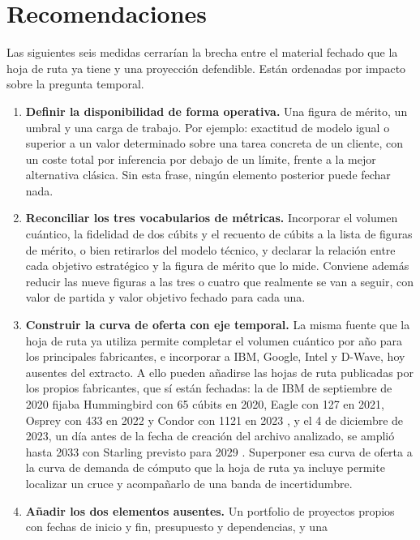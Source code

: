 \documentclass[11pt,letterpaper]{article}
\begin{document}
\section{Recomendaciones}

Las siguientes seis medidas cerrarían la brecha entre el material fechado que
la hoja de ruta ya tiene y una proyección defendible. Están ordenadas por
impacto sobre la pregunta temporal.

\begin{enumerate}[label=\textbf{\arabic*.}]
  \item \textbf{Definir la disponibilidad de forma operativa.} Una figura de
    mérito, un umbral y una carga de trabajo. Por ejemplo: exactitud de modelo
    igual o superior a un valor determinado sobre una tarea concreta de un
    cliente, con un coste total por inferencia por debajo de un límite, frente
    a la mejor alternativa clásica. Sin esta frase, ningún elemento posterior
    puede fechar nada.
  \item \textbf{Reconciliar los tres vocabularios de métricas.} Incorporar el
    volumen cuántico, la fidelidad de dos cúbits y el recuento de cúbits a la
    lista de figuras de mérito, o bien retirarlos del modelo técnico, y
    declarar la relación entre cada objetivo estratégico y la figura de mérito
    que lo mide. Conviene además reducir las nueve figuras a las tres o cuatro
    que realmente se van a seguir, con valor de partida y valor objetivo
    fechado para cada una.
  \item \textbf{Construir la curva de oferta con eje temporal.} La misma fuente
    que la hoja de ruta ya utiliza permite completar el volumen cuántico por
    año para los principales fabricantes, e incorporar a IBM, Google, Intel y
    D-Wave, hoy ausentes del extracto. A ello pueden añadirse las hojas de ruta
    publicadas por los propios fabricantes, que sí están fechadas: la de IBM de
    septiembre de 2020 fijaba Hummingbird con 65 cúbits en 2020, Eagle con 127
    en 2021, Osprey con 433 en 2022 y Condor con 1121 en 2023
    \parencite{ibm2020}, y el 4 de diciembre de 2023, un día antes de la fecha
    de creación del archivo analizado, se amplió hasta 2033 con Starling
    previsto para 2029 \parencite{ibm2023}. Superponer esa curva de oferta a la
    curva de demanda de cómputo que la hoja de ruta ya incluye permite
    localizar un cruce y acompañarlo de una banda de incertidumbre.
  \item \textbf{Añadir los dos elementos ausentes.} Un portfolio de proyectos
    propios con fechas de inicio y fin, presupuesto y dependencias, y una

\end{enumerate}
\end{document}
